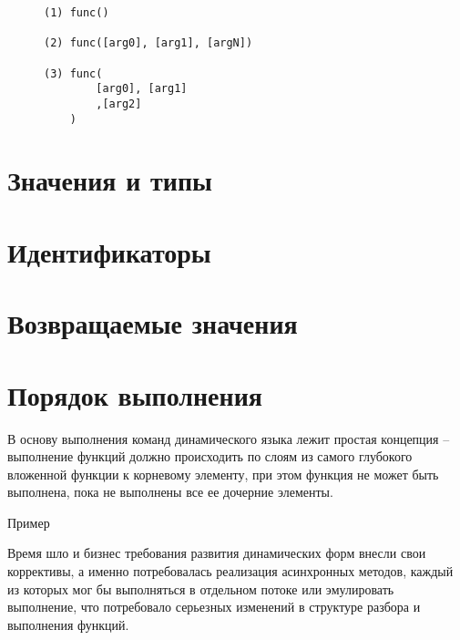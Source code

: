 \documentclass[../index.tex]{subfiles}
\begin{document}
\begin{figure}\label{lst:lecsic}
\begin{verbatim}
(1) func()

(2) func([arg0], [arg1], [argN])

(3) func(
        [arg0], [arg1]
        ,[arg2]
    )
\end{verbatim}        
\end{figure}\label{lst:lecsic}

\section{Значения и типы}\label{sec:types}

\section{Идентификаторы}

\section{Возвращаемые значения}

\section{Порядок выполнения}\label{sec:execrules} 
В основу выполнения команд динамического языка лежит простая концепция -- выполнение функций должно происходить по слоям из самого глубокого вложенной функции к корневому элементу, при этом функция не может быть выполнена, пока не выполнены все ее дочерние элементы.

Пример

Время шло и бизнес требования развития динамических форм внесли свои коррективы, а именно потребовалась реализация асинхронных методов, каждый из которых мог бы выполняться в отдельном потоке или эмулировать выполнение, что потребовало серьезных изменений в структуре разбора и выполнения функций.
\end{document}
